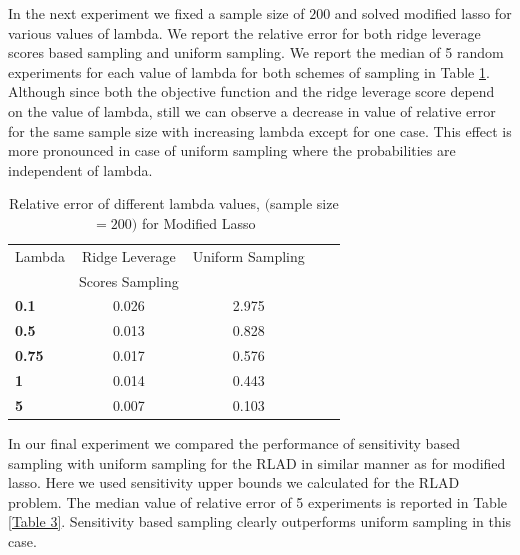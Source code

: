 In the next experiment we fixed a sample size of $200$ and solved modified lasso for various values of lambda. We report the relative error for both ridge leverage scores based sampling and uniform sampling. We report the median of 5 random experiments for each value of lambda for both schemes of sampling in Table \ref{Table 2}. Although since both the objective function and the ridge leverage score depend on the value of lambda, still we can observe a decrease in value of relative error for the same sample size with increasing lambda except for one case. This effect is more pronounced in case of uniform sampling where the probabilities are independent of lambda.
\begin{table}[t]
\caption{Relative error of different lambda values, $($sample size $=200)$ for Modified Lasso}
\label{Table 2}
\vskip 0.15in
\begin{center}
\begin{small}
\begin{sc}
\begin{tabular}{lcccr}
\toprule
Lambda & Ridge Leverage & Uniform Sampling \\
& Scores Sampling & \\ 
\midrule
\textbf{0.1}  & 0.026  & 2.975  \\
\textbf{0.5}  & 0.013  & 0.828 \\
\textbf{0.75} & 0.017  & 0.576 \\
\textbf{1}    & 0.014  & 0.443  \\
\textbf{5}    & 0.007  & 0.103 \\
\bottomrule
\end{tabular}
\end{sc}
\end{small}
\end{center}
\vskip -0.1in
\end{table}
In our final experiment we compared the performance of sensitivity based sampling with uniform sampling for the RLAD in similar manner as for modified lasso. Here we used sensitivity upper bounds we calculated for the RLAD problem. The median value of relative error of 5 experiments is reported in Table \ref{Table 3}. Sensitivity based sampling clearly outperforms uniform sampling in this case.

